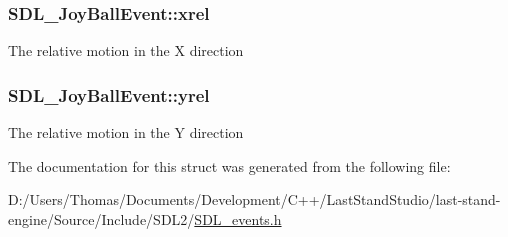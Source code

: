 \subsubsection[{xrel}]{ S\+D\+L\+\_\+\+Joy\+Ball\+Event\+::xrel}\label{structSDL__JoyBallEvent_a959a8473aa1964e5e1778c27a9ffd261}
The relative motion in the X direction \hypertarget{structSDL__JoyBallEvent_a28ad48a9eb7a5d3ff62ccba09fcead76}{}
\subsubsection[{yrel}]{ S\+D\+L\+\_\+\+Joy\+Ball\+Event\+::yrel}\label{structSDL__JoyBallEvent_a28ad48a9eb7a5d3ff62ccba09fcead76}
The relative motion in the Y direction 

The documentation for this struct was generated from the following file\+:\begin{DoxyCompactItemize}
\item 
D\+:/\+Users/\+Thomas/\+Documents/\+Development/\+C++/\+Last\+Stand\+Studio/last-\/stand-\/engine/\+Source/\+Include/\+S\+D\+L2/\hyperlink{SDL__events_8h}{S\+D\+L\+\_\+events.\+h}\end{DoxyCompactItemize}
